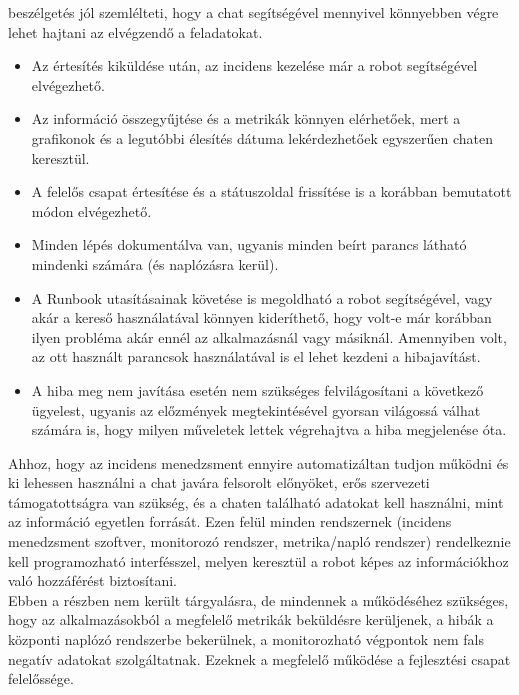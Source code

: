  beszélgetés jól szemlélteti, hogy a chat segítségével mennyivel könnyebben végre lehet hajtani az elvégzendő a feladatokat.\\
\begin{itemize}
  \item Az értesítés kiküldése után, az incidens kezelése már a robot segítségével elvégezhető.
  \item Az információ összegyűjtése és a metrikák könnyen elérhetőek, mert a grafikonok és a legutóbbi élesítés dátuma lekérdezhetőek egyszerűen chaten keresztül.
  \item A felelős csapat értesítése és a státuszoldal frissítése is a korábban bemutatott módon elvégezhető.
  \item Minden lépés dokumentálva van, ugyanis minden beírt parancs látható mindenki számára (és naplózásra kerül).
  \item A Runbook utasításainak követése is megoldható a robot segítségével, vagy akár a kereső használatával könnyen kideríthető, hogy volt-e már korábban ilyen probléma akár ennél az alkalmazásnál vagy másiknál. Amennyiben volt, az ott használt parancsok használatával is el lehet kezdeni a hibajavítást.
  \item A hiba meg nem javítása esetén nem szükséges felvilágosítani a következő ügyelest, ugyanis az előzmények megtekintésével gyorsan világossá válhat számára is, hogy milyen műveletek lettek végrehajtva a hiba megjelenése óta.
\end{itemize}

Ahhoz, hogy az incidens menedzsment ennyire automatizáltan tudjon működni és ki lehessen használni a chat javára felsorolt előnyöket, erős szervezeti támogatottságra van szükség, és a chaten található adatokat kell használni, mint az információ egyetlen forrását. Ezen felül minden rendszernek (incidens menedzsment szoftver, monitorozó rendszer, metrika/napló rendszer) rendelkeznie kell programozható interfésszel, melyen keresztül a robot képes az információkhoz való hozzáférést biztosítani.\\
Ebben a részben nem került tárgyalásra, de mindennek a működéséhez szükséges, hogy az alkalmazásokból a megfelelő metrikák beküldésre kerüljenek, a hibák a központi naplózó rendszerbe bekerülnek, a monitorozható végpontok nem fals negatív adatokat szolgáltatnak. Ezeknek a megfelelő működése a fejlesztési csapat felelőssége.